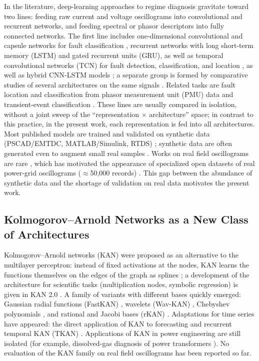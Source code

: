 \documentclass{ieeeojies}
\begin{document}
In the literature, deep-learning approaches to regime diagnosis gravitate toward two lines: feeding raw current and voltage oscillograms into convolutional and recurrent networks, and feeding spectral or phasor descriptors into fully connected networks. The first line includes one-dimensional convolutional and capsule networks for fault classification \cite{ref12, ref13}, recurrent networks with long short-term memory (LSTM) and gated recurrent units (GRU), as well as temporal convolutional networks (TCN) for fault detection, classification, and location \cite{ref14, ref15, ref16}, as well as hybrid CNN-LSTM models \cite{ref17, ref18}; a separate group is formed by comparative studies of several architectures on the same signals \cite{ref19, ref16}. Related tasks are fault location and classification from phasor measurement unit (PMU) data \cite{ref20} and transient-event classification \cite{ref21, ref22}. These lines are usually compared in isolation, without a joint sweep of the ``representation $\times$ architecture'' space; in contrast to this practice, in the present work, each representation is fed into all architectures. Most published models are trained and validated on synthetic data (PSCAD/EMTDC, MATLAB/Simulink, RTDS) \cite{ref23, ref15, ref20}; synthetic data are often generated even to augment small real samples \cite{ref21}. Works on real field oscillograms are rare \cite{ref22, ref24}, which has motivated the appearance of specialized open datasets of real power-grid oscillograms ($\approx$50,000 records) \cite{ref25}. This gap between the abundance of synthetic data and the shortage of validation on real data motivates the present work.

\subsection{Kolmogorov--Arnold Networks as a New Class of Architectures}

Kolmogorov–Arnold networks (KAN) were proposed as an alternative to the multilayer perceptron: instead of fixed activations at the nodes, KAN learns the functions themselves on the edges of the graph as splines \cite{ref3}; a development of the architecture for scientific tasks (multiplication nodes, symbolic regression) is given in KAN 2.0 \cite{ref26}. A family of variants with different bases quickly emerged: Gaussian radial functions (FastKAN) \cite{ref27}, wavelets (Wav-KAN) \cite{ref28}, Chebyshev polynomials \cite{ref29}, and rational and Jacobi bases (rKAN) \cite{ref30}. Adaptations for time series have appeared: the direct application of KAN to forecasting \cite{ref31} and recurrent temporal KAN (TKAN) \cite{ref32}. Applications of KAN in power engineering are still isolated (for example, dissolved-gas diagnosis of power transformers \cite{ref33}). No evaluation of the KAN family on real field oscillograms has been reported so far.
\end{document}
